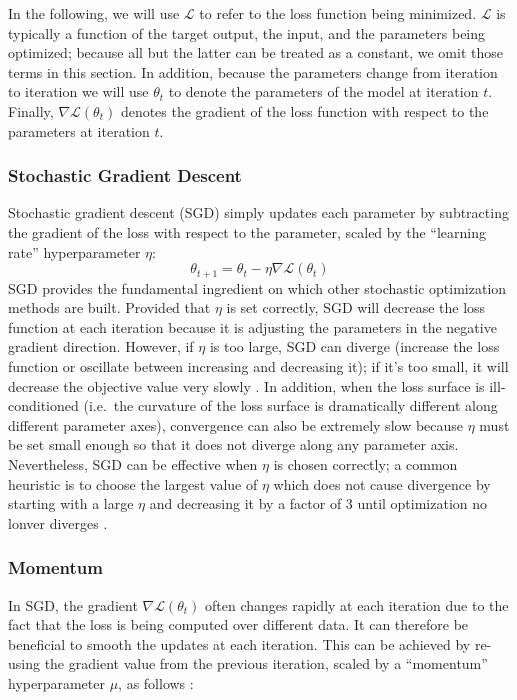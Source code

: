 In the following, we will use $\mathcal{L}$ to refer to the loss function being minimized.
$\mathcal{L}$ is typically a function of the target output, the input, and the parameters being optimized; because all but the latter can be treated as a constant, we omit those terms in this section.
In addition, because the parameters change from iteration to iteration we will use $\theta_t$ to denote the parameters of the model at iteration $t$.
Finally, $\nabla \mathcal{L}(\theta_t)$ denotes the gradient of the loss function with respect to the parameters at iteration $t$.

\subsubsection{Stochastic Gradient Descent}

Stochastic gradient descent (SGD) simply updates each parameter by subtracting the gradient of the loss with respect to the parameter, scaled by the ``learning rate'' hyperparameter $\eta$:
\begin{equation}
\theta_{t + 1} = \theta_t - \eta \nabla \mathcal{L}(\theta_t)
\end{equation}
SGD provides the fundamental ingredient on which other stochastic optimization methods are built.
Provided that $\eta$ is set correctly, SGD will decrease the loss function at each iteration because it is adjusting the parameters in the negative gradient direction.
However, if $\eta$ is too large, SGD can diverge (increase the loss function or oscillate between increasing and decreasing it); if it's too small, it will decrease the objective value very slowly \cite{}.
In addition, when the loss surface is ill-conditioned (i.e.\ the curvature of the loss surface is dramatically different along different parameter axes), convergence can also be extremely slow because $\eta$ must be set small enough so that it does not diverge along any parameter axis.
Nevertheless, SGD can be effective when $\eta$ is chosen correctly; a common heuristic is to choose the largest value of $\eta$ which does not cause divergence by starting with a large $\eta$ and decreasing it by a factor of $3$ until optimization no lonver diverges \cite{}.

\subsubsection{Momentum}

In SGD, the gradient $\nabla \mathcal{L}(\theta_t)$ often changes rapidly at each iteration due to the fact that the loss is being computed over different data.
It can therefore be beneficial to smooth the updates at each iteration.
This can be achieved by re-using the gradient value from the previous iteration, scaled by a ``momentum'' hyperparameter $\mu$, as follows \cite{}:

